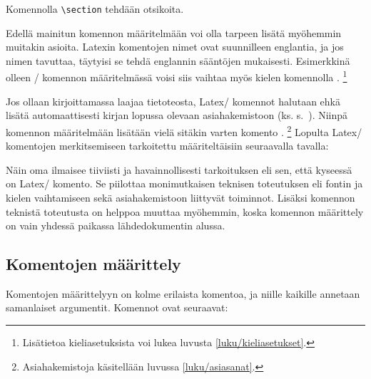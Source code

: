 \begin{tulossis}
  Komennolla \texttt{\textbackslash section} tehdään otsikoita.
\end{tulossis}

\noindent
Edellä mainitun komennon määritelmään voi olla tarpeen lisätä myöhemmin
muitakin asioita. Latexin komentojen nimet ovat suunnilleen englantia,
ja jos nimen tavuttaa, täytyisi se tehdä englannin sääntöjen mukaisesti.
Esimerkkinä olleen \-/ komennon määritelmässä voisi
siis vaihtaa myös kielen komennolla .%
\footnote{Lisätietoa kieliasetuksista voi lukea luvusta
  \ref{luku/kieliasetukset}.}

Jos ollaan kirjoittamassa laajaa tietoteosta, Latex\-/ komennot halutaan
ehkä lisätä automaattisesti kirjan lopussa olevaan asiahakemistoon (ks.
s.~\pageref{luku/asiahakemisto}). Niinpä komennon määritelmään lisätään
vielä sitäkin varten komento .%
\footnote{Asiahakemistoja käsitellään luvussa \ref{luku/asiasanat}.}
Lopulta Latex\-/ komentojen merkitsemiseen tarkoitettu
 määriteltäisiin seuraavalla tavalla:

\begin{koodilohkosis}
\newcommand{\komento}[1]{%
  \texttt{\textbackslash\textenglish{#1}}%
  \index[komennot]{#1@\texttt{\textbackslash #1}}}
\end{koodilohkosis}


\noindent
Näin oma  ilmaisee tiiviisti ja havainnollisesti
tarkoituksen eli sen, että kyseessä on Latex\-/ komento. Se piilottaa
monimutkaisen teknisen toteutuksen eli fontin ja kielen vaihtamiseen
sekä asiahakemistoon liittyvät toiminnot. Lisäksi komennon teknistä
toteutusta on helppoa muuttaa myöhemmin, koska komennon määrittely on
vain yhdessä paikassa lähdedokumentin alussa.

\subsection{Komentojen määrittely}
\label{luku/komennot-määrittely}

Komentojen määrittelyyn on kolme erilaista komentoa, ja niille kaikille
annetaan samanlaiset argumentit. Komennot ovat seuraavat:


